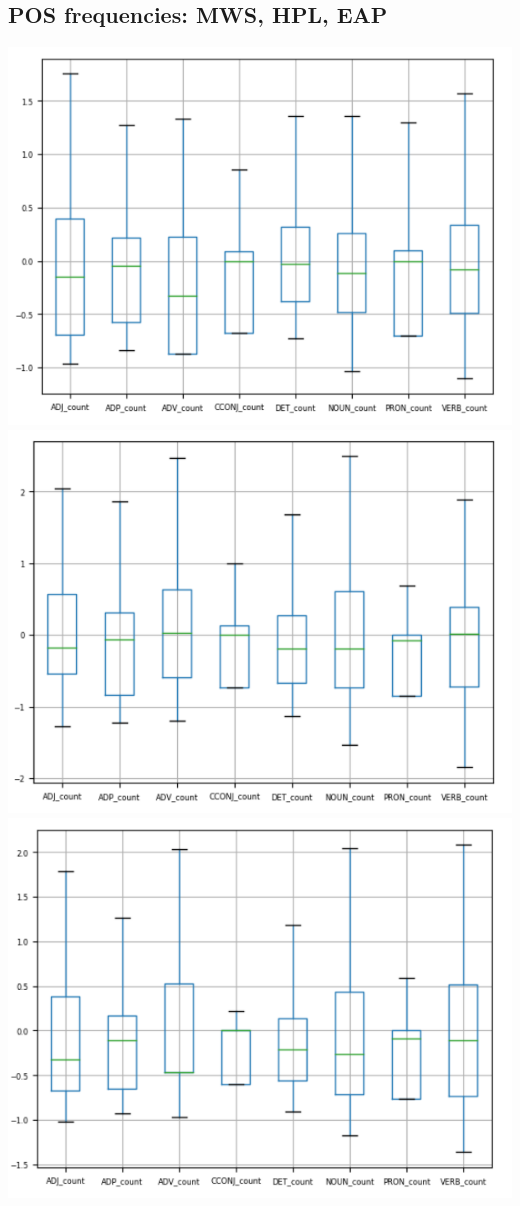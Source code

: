 \documentclass[8pt]{article}
\begin{document}
\subsection{POS frequencies: MWS, HPL, EAP}
\includegraphics[scale=.50, center]{images/tag_mws.png}
\vskip 0.2in
\includegraphics[scale=.50, center]{images/tag_hpl.png}
\vskip 0.2in
\includegraphics[scale=.50, center]{images/tag_eap.png}
\end{document}
